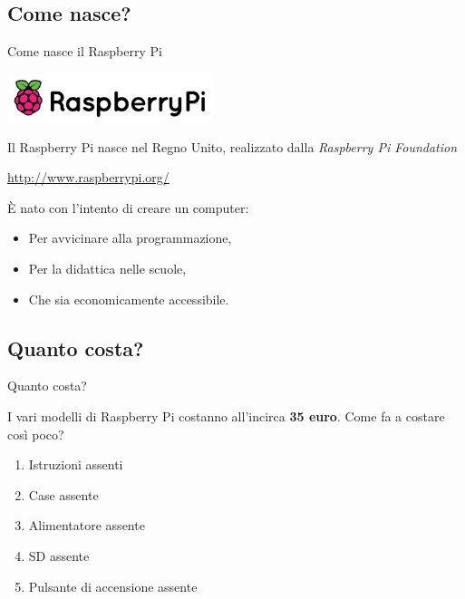 \documentclass[xcolor=svgnames,11pt]{beamer}
\begin{document}
\subsection{Come nasce?}
\begin{frame}{Come nasce il Raspberry Pi}
\begin{center}
\includegraphics[width=6cm]{logo_raspi.png}
\end{center}
\pause

Il Raspberry Pi nasce nel Regno Unito, realizzato dalla \emph{Raspberry Pi Foundation}

\begin{center}
\url{http://www.raspberrypi.org/}
\end{center}

\pause
\medskip

\begin{block}{}
\`E nato con l'intento di creare un computer:
\pause
\begin{itemize}
\item Per avvicinare alla programmazione,
\pause
\item Per la didattica nelle scuole,
\pause
\item Che sia economicamente accessibile.
\end{itemize}
\end{block}
\end{frame}

\subsection{Quanto costa?}
\begin{frame}{Quanto costa?}

I vari modelli di Raspberry Pi costanno all'incirca \textbf{35 euro}. Come fa a costare cos\`i poco?

\medskip
\pause

\begin{enumerate}
\item Istruzioni assenti
\pause
\item Case assente
\pause
\item Alimentatore assente
\pause
\item SD assente
\pause
\item Pulsante di accensione assente
\end{enumerate}


\end{frame}
\end{document}
